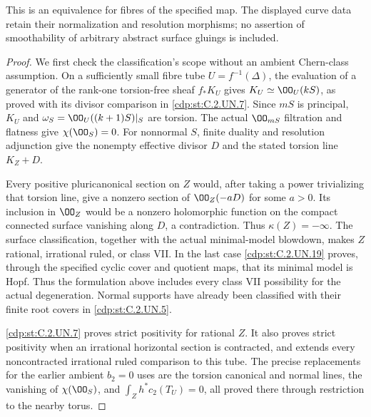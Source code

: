 \begin{proposition}
This is an equivalence for fibres of the specified map.
The displayed curve data retain their normalization and
resolution morphisms; no assertion of smoothability of
arbitrary abstract surface gluings is included.
\end{proposition}

\begin{proof}
We first check the classification's scope without an ambient
Chern-class assumption. On a sufficiently small fibre tube
$U=f^{-1}(\Delta)$, the evaluation of a generator of the
rank-one torsion-free sheaf $f_*K_U$ gives
$K_U\simeq\OO_U(kS)$, as proved with its divisor comparison
in \ref{cdp:st:C.2.UN.7}. Since $mS$ is principal, $K_U$ and
$\omega_S=\OO_U((k+1)S)|_S$ are torsion. The actual
$\OO_{mS}$ filtration and flatness give
$\chi(\OO_S)=0$. For nonnormal $S$, finite duality and
resolution adjunction give the nonempty effective divisor
$D$ and the stated torsion line $K_Z+D$.

Every positive pluricanonical section on $Z$ would, after
taking a power trivializing that torsion line, give a
nonzero section of $\OO_Z(-aD)$ for some $a>0$.
Its inclusion in $\OO_Z$ would be a nonzero holomorphic
function on the compact connected surface vanishing along
$D$, a contradiction. Thus $\kappa(Z)=-\infty$.
The surface classification, together with the actual
minimal-model blowdown, makes $Z$ rational, irrational
ruled, or class VII. In the last case \ref{cdp:st:C.2.UN.19} proves,
through the specified cyclic cover and quotient maps,
that its minimal model is Hopf. Thus the formulation
above includes every class VII possibility for the
actual degeneration. Normal supports have already been
classified with their finite root covers in \ref{cdp:st:C.2.UN.5}.

\ref{cdp:st:C.2.UN.7} proves strict positivity for rational $Z$.
It also proves strict positivity when an irrational
horizontal section is contracted, and extends every
noncontracted irrational ruled comparison to this tube.
The precise replacements for the earlier ambient $b_2=0$
uses are the torsion canonical and normal lines, the
vanishing of $\chi(\OO_S)$, and
$\int_Zh^*c_2(T_U)=0$, all proved there through restriction
to the nearby torus.


\end{proof}
